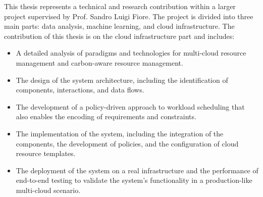 














This thesis represents a technical and research contribution within a larger project supervised by Prof. Sandro Luigi Fiore. 
The project is divided into three main parts: data analysis, machine learning, and cloud infrastructure.
The contribution of this thesis is on the cloud infrastructure part and includes:
\begin{itemize}
    \item A detailed analysis of paradigms and technologies for multi-cloud resource management and carbon-aware resource management.
    \item The design of the system architecture, including the identification of components, interactions, and data flows.
    \item The development of a policy-driven approach to workload scheduling that also enables the encoding of requirements and constraints.
    \item The implementation of the system, including the integration of the components, the development of policies, and the configuration of cloud resource templates.
    \item The deployment of the system on a real infrastructure and the performance of end-to-end testing to validate the system's functionality in a production-like multi-cloud scenario.
\end{itemize}

\newpage
